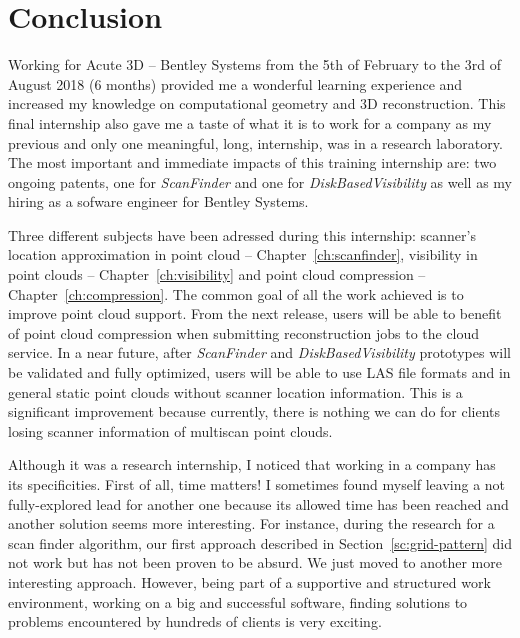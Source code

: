 \chapter{Conclusion}
\label{ch:conclusion}

Working for Acute 3D -- Bentley Systems from the 5th of February to the 3rd of August 2018 (6 months) provided me a wonderful learning experience and increased my knowledge on computational geometry and 3D reconstruction. This final internship also gave me a taste of what it is to work for a company as my previous and only one meaningful, long, internship, was in a research laboratory. The most important and immediate impacts of this training internship are: two ongoing patents, one for
\emph{ScanFinder} and one for \emph{DiskBasedVisibility} as well as my hiring as a sofware engineer for Bentley Systems.

Three different subjects have been adressed during this internship: scanner's location approximation in point cloud -- Chapter~\ref{ch:scanfinder}, visibility in point clouds -- Chapter~\ref{ch:visibility} and point cloud compression -- Chapter~\ref{ch:compression}. The common goal of all the work achieved is to improve \CC point cloud support. From the next \CC release, users will be able to benefit of point cloud compression when submitting reconstruction jobs to the cloud service. In a near future, after \emph{ScanFinder} and \emph{DiskBasedVisibility} prototypes will be validated and fully optimized, users will be able to use LAS file formats and in general static point clouds without scanner location information. This is a significant improvement because currently, there is nothing we can do for clients losing scanner information of multiscan point clouds.

Although it was a research internship, I noticed that working in a company has its specificities. First of all, time matters! I sometimes found myself leaving a not fully-explored lead for another one because its allowed time has been reached and another solution seems more interesting. For instance, during the research for a scan finder algorithm, our first approach described in Section~\ref{sc:grid-pattern} did not work but has not been proven to be absurd. We just moved to another more
interesting approach. However, being part of a supportive and structured work environment, working on a big and successful software, finding solutions to problems encountered by hundreds of clients is very exciting.

